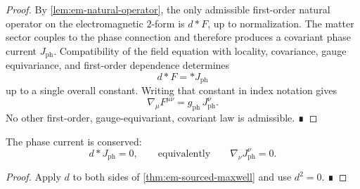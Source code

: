 \begin{proof}
	By \cref{lem:em-natural-operator}, the only admissible first-order
	natural operator on the electromagnetic \(2\)-form is \(d{*}F\), up to
	normalization.
	The matter sector couples to the phase connection and therefore
	produces a covariant phase current \(J_{\mathrm{ph}}\).
	Compatibility of the field equation with locality, covariance, gauge
	equivariance, and first-order dependence determines
	\[
		d{*}F = {*}J_{\mathrm{ph}}
	\]
	up to a single overall constant.
	Writing that constant in index notation gives
	\[
		\nabla_\mu F^{\mu\nu}=g_{\mathrm{ph}}\,J_{\mathrm{ph}}^\nu.
	\]
	No other first-order, gauge-equivariant, covariant law is admissible.
	∎
\end{proof}
\begin{corollary}
	The phase current is conserved:
	\[
		d{*}J_{\mathrm{ph}}=0,
		\qquad\text{equivalently}\qquad
		\nabla_\nu J_{\mathrm{ph}}^\nu=0.
	\]
\end{corollary}
\begin{proof}
	Apply \(d\) to both sides of \cref{thm:em-sourced-maxwell} and use
	\(d^2=0\). ∎
\end{proof}
